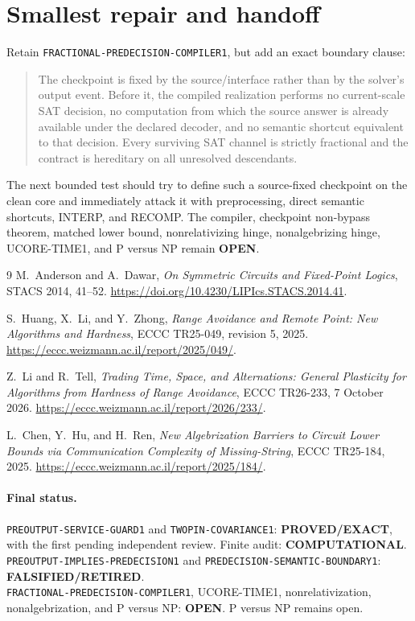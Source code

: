 \documentclass[11pt]{article}
\newcommand{\EXACT}{\textbf{PROVED/EXACT}}
\newcommand{\OPEN}{\textbf{OPEN}}
\newcommand{\RETIRED}{\textbf{FALSIFIED/RETIRED}}
\newcommand{\COMP}{\textbf{COMPUTATIONAL}}
\begin{document}
\section{Smallest repair and handoff}

Retain \texttt{FRACTIONAL-PREDECISION-COMPILER1}, but add an exact boundary
clause:
\begin{quote}
The checkpoint is fixed by the source/interface rather than by the solver's
output event.  Before it, the compiled realization performs no current-scale
SAT decision, no computation from which the source answer is already
available under the declared decoder, and no semantic shortcut equivalent to
that decision.  Every surviving SAT channel is strictly fractional and the
contract is hereditary on all unresolved descendants.
\end{quote}
The next bounded test should try to define such a source-fixed checkpoint on
the clean core and immediately attack it with preprocessing, direct semantic
shortcuts, INTERP, and RECOMP.  The compiler, checkpoint non-bypass theorem,
matched lower bound, nonrelativizing hinge, nonalgebrizing hinge, UCORE-TIME1,
and P versus NP remain \OPEN.

\begin{thebibliography}{9}
M.~Anderson and A.~Dawar,
\emph{On Symmetric Circuits and Fixed-Point Logics},
STACS 2014, 41--52.
\url{https://doi.org/10.4230/LIPIcs.STACS.2014.41}.

S.~Huang, X.~Li, and Y.~Zhong,
\emph{Range Avoidance and Remote Point: New Algorithms and Hardness},
ECCC TR25-049, revision 5, 2025.
\url{https://eccc.weizmann.ac.il/report/2025/049/}.

Z.~Li and R.~Tell,
\emph{Trading Time, Space, and Alternations: General Plasticity for Algorithms
from Hardness of Range Avoidance},
ECCC TR26-233, 7 October 2026.
\url{https://eccc.weizmann.ac.il/report/2026/233/}.

L.~Chen, Y.~Hu, and H.~Ren,
\emph{New Algebrization Barriers to Circuit Lower Bounds via Communication
Complexity of Missing-String}, ECCC TR25-184, 2025.
\url{https://eccc.weizmann.ac.il/report/2025/184/}.
\end{thebibliography}

\paragraph{Final status.}
\texttt{PREOUTPUT-SERVICE-GUARD1} and \texttt{TWOPIN-COVARIANCE1}: \EXACT,
with the first pending independent review.  Finite audit: \COMP.\\
\texttt{PREOUTPUT-IMPLIES-PREDECISION1} and
\texttt{PREDECISION-SEMANTIC-BOUNDARY1}: \RETIRED.\\
\texttt{FRACTIONAL-PREDECISION-COMPILER1}, UCORE-TIME1,
nonrelativization, nonalgebrization, and P versus NP: \OPEN.
P versus NP remains open.

\end{document}
